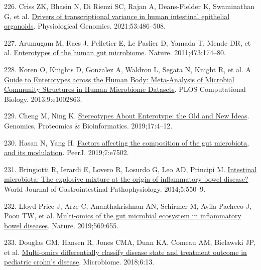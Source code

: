 \documentclass[
  12pt,
  a4paper,
  twoside,
  openright]{book}
\newlength{\cslhangindent}
\newlength{\cslentryspacingunit} %
\newenvironment{CSLReferences}[2] %
 {%
  \setlength{\parindent}{0pt}
  \ifodd #1
  \let\oldpar\par
  \def\par{\hangindent=\cslhangindent\oldpar}
  \fi
  \setlength{\parskip}{#2\cslentryspacingunit}
 }%
 {}
\begin{document}
\begin{CSLReferences}{0}{0}
\leavevmode{}%
226. Criss ZK, Bhasin N, Di Rienzi SC, Rajan A, Deans-Fielder K, Swaminathan G, et al. \href{https://doi.org/10.1152/physiolgenomics.00061.2021}{Drivers of transcriptional variance in human intestinal epithelial organoids}. Physiological Genomics. 2021;53:486--508.

\leavevmode{}%
227. Arumugam M, Raes J, Pelletier E, Le Paslier D, Yamada T, Mende DR, et al. \href{https://doi.org/10.1038/nature09944}{Enterotypes of the human gut microbiome}. Nature. 2011;473:174--80.

\leavevmode{}%
228. Koren O, Knights D, Gonzalez A, Waldron L, Segata N, Knight R, et al. \href{https://doi.org/10.1371/journal.pcbi.1002863}{A Guide to Enterotypes across the Human Body: Meta-Analysis of Microbial Community Structures in Human Microbiome Datasets}. PLOS Computational Biology. 2013;9:e1002863.

\leavevmode{}%
229. Cheng M, Ning K. \href{https://doi.org/10.1016/j.gpb.2018.02.004}{Stereotypes About Enterotype: the Old and New Ideas}. Genomics, Proteomics \& Bioinformatics. 2019;17:4--12.

\leavevmode{}%
230. Hasan N, Yang H. \href{https://doi.org/10.7717/peerj.7502}{Factors affecting the composition of the gut microbiota, and its modulation}. PeerJ. 2019;7:e7502.

\leavevmode{}%
231. Bringiotti R, Ierardi E, Lovero R, Losurdo G, Leo AD, Principi M. \href{https://doi.org/10.4291/wjgp.v5.i4.550}{Intestinal microbiota: The explosive mixture at the origin of inflammatory bowel disease?} World Journal of Gastrointestinal Pathophysiology. 2014;5:550--9.

\leavevmode{}%
232. Lloyd-Price J, Arze C, Ananthakrishnan AN, Schirmer M, Avila-Pacheco J, Poon TW, et al. \href{https://doi.org/10.1038/s41586-019-1237-9}{Multi-omics of the gut microbial ecosystem in inflammatory bowel diseases}. Nature. 2019;569:655.

\leavevmode{}%
233. Douglas GM, Hansen R, Jones CMA, Dunn KA, Comeau AM, Bielawski JP, et al. \href{https://doi.org/10.1186/s40168-018-0398-3}{Multi-omics differentially classify disease state and treatment outcome in pediatric crohn{'}s disease}. Microbiome. 2018;6:13.


\end{CSLReferences}
\end{document}
